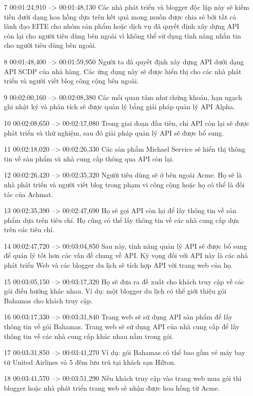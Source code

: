 7
00:01:24,910 --> 00:01:48,130
Các nhà phát triển và blogger độc lập này sẽ kiếm tiền dưới dạng hoa hồng dựa trên kết quả mong muốn được chia sẻ bởi tất cả lãnh đạo EITE cho nhóm sản phẩm hoặc dịch vụ đã quyết định xây dựng API còn lại cho người tiêu dùng bên ngoài vì không thể sử dụng tính năng nhắn tin cho người tiêu dùng bên ngoài.

8
00:01:48,400 --> 00:01:59,950
Người ta đã quyết định xây dựng API dưới dạng API SCDP của nhà hàng.  Các ứng dụng này sẽ được hiển thị cho các nhà phát triển và người viết blog công cộng bên ngoài.

9
00:02:00,160 --> 00:02:08,380
Các mối quan tâm như chứng khoán, hạn ngạch ghi nhật ký và phân tích sẽ được quản lý bằng giải pháp quản lý API Alpha.

10
00:02:08,650 --> 00:02:17,080
Trong giai đoạn đầu tiên, chỉ API còn lại sẽ được phát triển và thử nghiệm, sau đó giải pháp quản lý API sẽ được bổ sung.

11
00:02:18,020 --> 00:02:26,330
Các sản phẩm Michael Service sẽ hiển thị thông tin về sản phẩm và nhà cung cấp thông qua API còn lại.

12
00:02:26,420 --> 00:02:35,320
Người tiêu dùng sẽ ở bên ngoài Acme.  Họ sẽ là nhà phát triển và người viết blog trong phạm vi công cộng hoặc họ có thể là đối tác của Achmat.

13
00:02:35,390 --> 00:02:47,690
Họ sẽ gọi API còn lại để lấy thông tin về sản phẩm dựa trên tiêu chí.  Họ cũng có thể lấy thông tin về các nhà cung cấp dựa trên các tiêu chí.

14
00:02:47,720 --> 00:03:04,850
Sau này, tính năng quản lý API sẽ được bổ sung để quản lý tốt hơn các vấn đề chung về API.  Kỳ vọng đối với API này là các nhà phát triển Web và các blogger du lịch sẽ tích hợp API với trang web của họ.

15
00:03:05,150 --> 00:03:17,320
Họ sẽ đưa ra đề xuất cho khách truy cập về các gói điều hướng khác nhau.  Ví dụ: một blogger du lịch có thể giới thiệu gói Bahamas cho khách truy cập.

16
00:03:17,330 --> 00:03:31,840
Trang web sẽ sử dụng API sản phẩm để lấy thông tin về gói Bahamas. Trang web sẽ sử dụng API của nhà cung cấp để lấy thông tin về các nhà cung cấp khác nhau nằm trong gói.

17
00:03:31,850 --> 00:03:41,270
Ví dụ: gói Bahamas có thể bao gồm vé máy bay từ United Airlines và 5 đêm lưu trú tại khách sạn Hilton.

18
00:03:41,570 --> 00:03:51,290
Nếu khách truy cập vào trang web mua gói thì blogger hoặc nhà phát triển trang web sẽ nhận được hoa hồng từ Acme.

